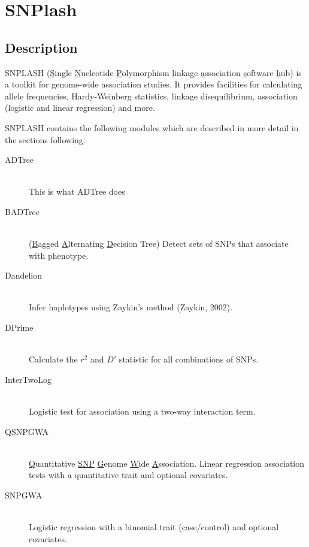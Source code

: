 \section{SNPlash}
\label{sec:snplash}

\subsection{Description}
SNPLASH (\underline{S}ingle \underline{N}ucleotide \underline{P}olymorphism
\underline{l}inkage \underline{a}ssociation \underline{s}oftware
\underline{h}ub) is a toolkit for genome-wide association studies.  It provides
facilities for calculating allele frequencies, Hardy-Weinberg statistics,
linkage disequilibrium, association (logistic and linear regression) and more.

SNPLASH contains the following modules which are described in more detail in the
sections following:

\begin{description}

  \item[ADTree]  \hfill \\
    This is what ADTree does

  \item[BADTree] \hfill \\
    (\underline{B}agged \underline{A}lternating \underline{D}ecision Tree)
    Detect sets of SNPs that associate with phenotype.

  \item[Dandelion] \hfill \\
    Infer haplotypes using Zaykin's method (Zaykin, 2002).

  \item[DPrime] \hfill \\
    Calculate the $r^2$ and $D'$ statistic for all combinations of SNPs.

  \item[InterTwoLog] \hfill \\
    Logistic test for association using a two-way interaction term.

  \item[QSNPGWA] \hfill \\
    \underline{Q}uantitative \underline{SNP} \underline{G}enome \underline{W}ide
    \underline{A}ssociation.  Linear regression association tests with a
    quantitative trait and optional covariates.

  \item[SNPGWA] \hfill \\
    Logistic regression with a binomial trait (case/control) and optional
    covariates. 

\end{description}

